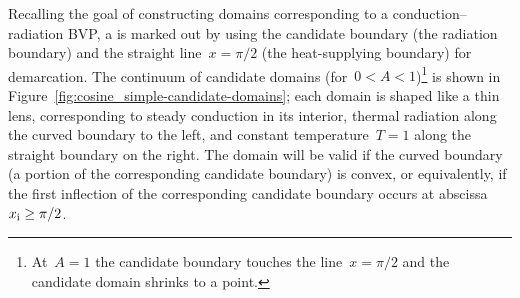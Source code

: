 Recalling the goal of constructing domains
corresponding to a conduction--radiation BVP\@,
a  is marked out by using
the candidate boundary (the radiation boundary)
and the straight line~$x = \pi/2$ (the heat-supplying boundary)
for demarcation.
The continuum of candidate domains (for~$0 < A < 1$)\footnote{
  At~$A = 1$ the candidate boundary touches the line~$x = \pi/2$
  and the candidate domain shrinks to a point.
}
is shown in Figure~\ref{fig:cosine_simple-candidate-domains};
each domain is shaped like a thin lens,
corresponding to steady conduction in its interior,
thermal radiation along the curved boundary to the left,
and constant temperature~$T = 1$ along the straight boundary on the right.
The domain will be valid if the curved boundary
(a portion of the corresponding candidate boundary)
is convex, or equivalently,
if the first inflection of the corresponding candidate boundary
occurs at abscissa~$x_{\mathrm{i}} \ge \pi/2$.

\begin{figure}
\end{figure}

